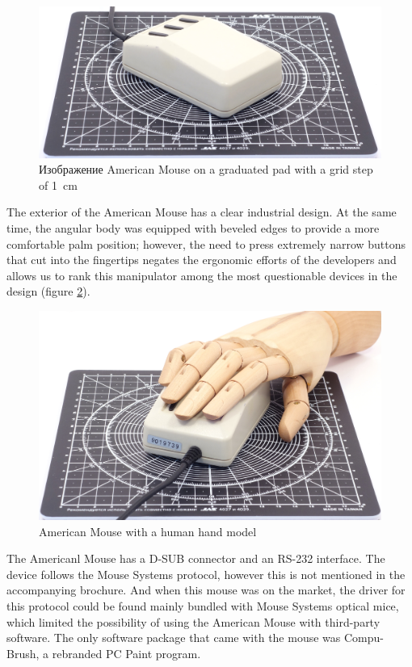 \documentclass[11pt, a4paper]{article}
\begin{document}
\begin{figure}[h]
    \centering
    \includegraphics[scale=0.5]{1986_american_mouse/size_30.jpg}
    \caption{Изображение American Mouse on a graduated pad with a grid step of 1~cm}
    \label{fig:AmericanSize}
\end{figure}

The exterior of the American Mouse has a clear industrial design. At the same time, the angular body was equipped with beveled edges to provide a more comfortable palm position; however, the need to press extremely narrow buttons that cut into the fingertips negates the ergonomic efforts of the developers and allows us to rank this manipulator among the most questionable devices in the design (figure \ref{fig:AmericanHand}).

\begin{figure}[h]
    \centering
    \includegraphics[scale=0.5]{1986_american_mouse/hand_30.jpg}
    \caption{American Mouse with a human hand model}
    \label{fig:AmericanHand}
\end{figure}

The Americanl Mouse has a D-SUB connector and an RS-232 interface. The device follows the Mouse Systems protocol, however this is not mentioned in the accompanying brochure. And when this mouse was on the market, the driver for this protocol could be found mainly bundled with Mouse Systems optical mice, which limited the possibility of using the American Mouse with third-party software. The only software package that came with the mouse was Compu-Brush, a rebranded PC Paint program.
\end{document}

